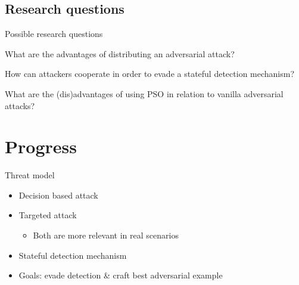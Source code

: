 \documentclass[11pt,t]{beamer}
\begin{document}
\subsection{Research questions}
\begin{frame}{Possible research questions}
\begin{exampleblock}
	{What are the advantages of distributing an adversarial attack?}
	\end{exampleblock}
	
	\begin{exampleblock}
	{How can attackers cooperate in order to evade a stateful detection mechanism?}
	\end{exampleblock}
	
	\begin{exampleblock}
	{What are the (dis)advantages of using PSO in relation to vanilla adversarial attacks?}
	\end{exampleblock}
\end{frame}


\section{Progress}
\begin{frame}{Threat model}
\begin{itemize}
	\item Decision based attack
	\item Targeted attack
	\begin{itemize}
		\item Both are more relevant in real scenarios
	\end{itemize}
	\item Stateful detection mechanism
	\item Goals: evade detection \& craft best adversarial example	
\end{itemize}
\end{frame}
\end{document}
